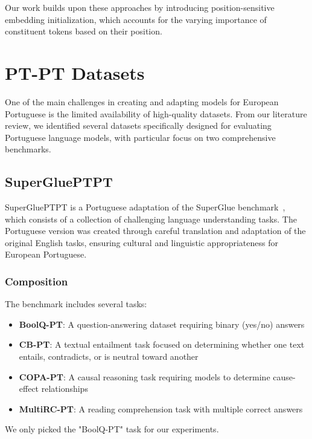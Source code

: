Our work builds upon these approaches by introducing position-sensitive embedding initialization, which accounts for the varying importance of constituent tokens based on their position.

\section{PT-PT Datasets}\label{Section3.3}
One of the main challenges in creating and adapting models for European Portuguese is the limited availability of high-quality datasets. From our literature review, we identified several datasets specifically designed for evaluating Portuguese language models, with particular focus on two comprehensive benchmarks.

\subsection{SuperGluePTPT}\label{Section3.3.1}
SuperGluePTPT is a Portuguese adaptation of the SuperGlue benchmark~\cite{wang2019superglue}, which consists of a collection of challenging language understanding tasks. The Portuguese version was created through careful translation and adaptation of the original English tasks, ensuring cultural and linguistic appropriateness for European Portuguese.

\subsubsection{Composition}
The benchmark includes several tasks:
\begin{itemize}
    \item \textbf{BoolQ-PT}: A question-answering dataset requiring binary (yes/no) answers
    \item \textbf{CB-PT}: A textual entailment task focused on determining whether one text entails, contradicts, or is neutral toward another
    \item \textbf{COPA-PT}: A causal reasoning task requiring models to determine cause-effect relationships
    \item \textbf{MultiRC-PT}: A reading comprehension task with multiple correct answers
\end{itemize}
We only picked the "BoolQ-PT" task for our experiments.

